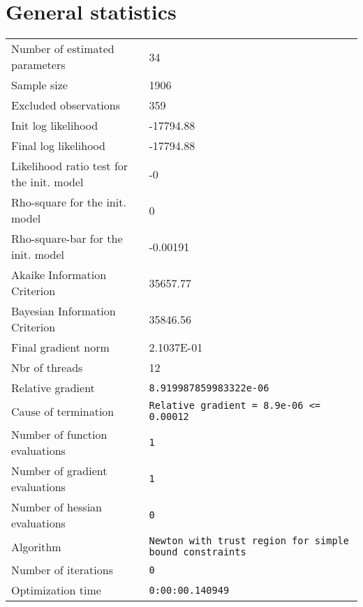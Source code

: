 



\section{General statistics}
\begin{tabular}{ll}
Number of estimated parameters & 34 \\
Sample size & 1906 \\
Excluded observations & 359 \\
Init log likelihood & -17794.88 \\
Final log likelihood & -17794.88 \\
Likelihood ratio test for the init. model & -0 \\
Rho-square for the init. model & 0 \\
Rho-square-bar for the init. model & -0.00191 \\
Akaike Information Criterion & 35657.77 \\
Bayesian Information Criterion & 35846.56 \\
Final gradient norm & 2.1037E-01 \\
Nbr of threads & 12 \\
Relative gradient & \verb$8.919987859983322e-06$ \\
Cause of termination & \verb$Relative gradient = 8.9e-06 <= 0.00012$ \\
Number of function evaluations & \verb$1$ \\
Number of gradient evaluations & \verb$1$ \\
Number of hessian evaluations & \verb$0$ \\
Algorithm & \verb$Newton with trust region for simple bound constraints$ \\
Number of iterations & \verb$0$ \\
Optimization time & \verb$0:00:00.140949$ \\
\end{tabular}

